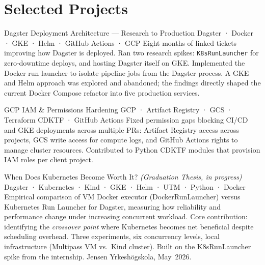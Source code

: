 \section*{Selected Projects}

\project%
  {Dagster Deployment Architecture — Research to Production}%
  {Dagster · Docker · GKE · Helm · GitHub Actions · GCP}%
  {Eight months of linked tickets improving how Dagster is deployed.
   Ran two research spikes: \texttt{K8sRunLauncher} for zero-downtime deploys, and hosting Dagster itself on GKE.
   Implemented the Docker run launcher to isolate pipeline jobs from the Dagster process.
   A GKE and Helm approach was explored and abandoned; the findings directly shaped the current
   Docker Compose refactor into five production services.}

\vspace{5pt}
\project%
  {GCP IAM \& Permissions Hardening}%
  {GCP · Artifact Registry · GCS · Terraform CDKTF · GitHub Actions}%
  {Fixed permission gaps blocking CI/CD and GKE deployments across multiple PRs:
   Artifact Registry access across projects, GCS write access for compute logs,
   and GitHub Actions rights to manage cluster resources.
   Contributed to Python CDKTF modules that provision IAM roles per client project.}

\vspace{5pt}
\project%
  {When Does Kubernetes Become Worth It? \textnormal{\textit{(Graduation Thesis, in progress)}}}%
  {Dagster · Kubernetes · Kind · GKE · Helm · UTM · Python · Docker}%
  {Empirical comparison of VM Docker executor (DockerRunLauncher) versus Kubernetes Run Launcher for Dagster,
   measuring how reliability and performance change under increasing concurrent workload.
   Core contribution: identifying the \emph{crossover point} where Kubernetes becomes net
   beneficial despite scheduling overhead.
   Three experiments, six concurrency levels, local infrastructure (Multipass VM vs.\ Kind cluster).
   Built on the K8sRunLauncher spike from the internship.
   Jensen Yrkesh\"{o}gskola, May~2026.}
